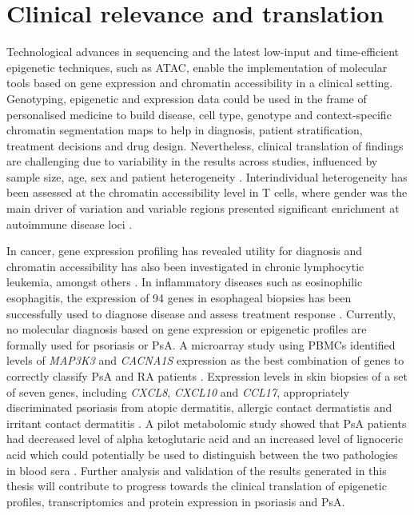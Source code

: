 \section{Clinical relevance and translation}
Technological advances in sequencing and the latest low-input and time-efficient epigenetic techniques, such as ATAC, enable the implementation of molecular tools based on gene expression and chromatin accessibility in a clinical setting. Genotyping, epigenetic and expression data could be used in the frame of personalised medicine to build disease, cell type, genotype and context-specific chromatin segmentation maps to help in diagnosis, patient stratification, treatment decisions and drug design. Nevertheless, clinical translation of findings are challenging due to variability in the results across studies, influenced by sample size, age, sex and patient heterogeneity \parencite{Shen-Orr2013}. Interindividual heterogeneity has been assessed at the chromatin accessibility level in T cells, where gender was the main driver of variation and variable regions presented significant enrichment at autoimmune disease loci \parencite{Qu2015}.

In cancer, gene expression profiling has revealed utility for diagnosis and chromatin accessibility has also been investigated in chronic lymphocytic leukemia, amongst others \parencite{Whitney2003,Rendeiro2016}. In inflammatory diseases such as eosinophilic esophagitis, the expression of 94 genes in esophageal biopsies has been successfully used to diagnose disease and assess treatment response \parencite{Dellon2018}. Currently, no molecular diagnosis based on gene expression or epigenetic profiles are formally used for psoriasis or PsA. A microarray study using PBMCs identified levels of \textit{MAP3K3} and \textit{CACNA1S} expression as the best combination of genes to correctly classify PsA and RA patients \parencite{Batliwalla2005}. Expression levels in skin biopsies of a set of seven genes, including \textit{CXCL8}, \textit{CXCL10} and \textit{CCL17}, appropriately discriminated psoriasis from atopic dermatitis, allergic contact dermatistis and irritant contact dermatitis \parencite{Zeeuwen2008}. A pilot metabolomic study showed that PsA patients had decreased level of alpha ketoglutaric acid and an increased level of lignoceric acid which could potentially be used to distinguish between the two pathologies in blood sera \parencite{Armstrong2014}. Further analysis and validation of the results generated in this thesis will contribute to progress towards the clinical translation of epigenetic profiles, transcriptomics and protein expression in psoriasis and PsA.

